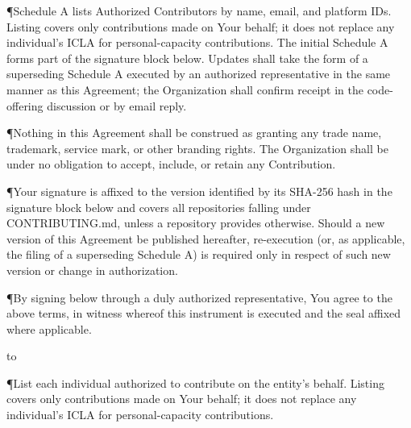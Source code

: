 
\P{}{Schedule A lists Authorized Contributors by name, email, and platform IDs. Listing covers only contributions made on Your behalf; it does not replace any individual's ICLA for personal-capacity contributions. The initial Schedule A forms part of the signature block below. Updates shall take the form of a superseding Schedule A executed by an authorized representative in the same manner as this Agreement; the Organization shall confirm receipt in the code-offering discussion or by email reply.}


\P{}{Nothing in this Agreement shall be construed as granting any trade name, trademark, service mark, or other branding rights. The Organization shall be under no obligation to accept, include, or retain any Contribution.}


\P{}{Your signature is affixed to the version identified by its SHA-256 hash in the signature block below and covers all repositories falling under CONTRIBUTING.md, unless a repository provides otherwise. Should a new version of this Agreement be published hereafter, re-execution (or, as applicable, the filing of a superseding Schedule A) is required only in respect of such new version or change in authorization.}


\P{}{By signing below through a duly authorized representative, You agree to the above terms, in witness whereof this instrument is executed and the seal affixed where applicable.}

\vskip 4mm

\par
\hbox to \hsize{\hskip 8mm \hrulefill \hskip 8mm}%
\vskip 3mm

\vskip 2mm

\P{}{List each individual authorized to contribute on the entity's behalf. Listing covers only contributions made on Your behalf; it does not replace any individual's ICLA for personal-capacity contributions.}


